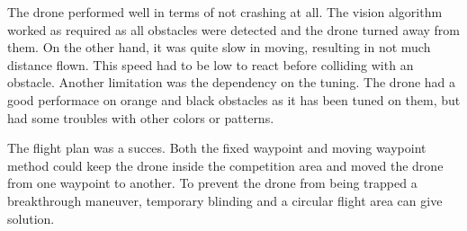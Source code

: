 The drone performed well in terms of not crashing at all. The vision algorithm worked as required as all obstacles were detected and the drone turned away from them. On the other hand, it was quite slow in moving, resulting in not much distance flown. This speed had to be low to react before colliding with an obstacle. Another limitation was the dependency on the tuning. The drone had a good performace on orange and black obstacles as it has been tuned on them, but had some troubles with other colors or patterns.

The flight plan was a succes. Both the fixed waypoint and moving waypoint method could keep the drone inside the competition area and moved the drone from one waypoint to another. To prevent the drone from being trapped a breakthrough maneuver, temporary blinding and a circular flight area can give solution.

